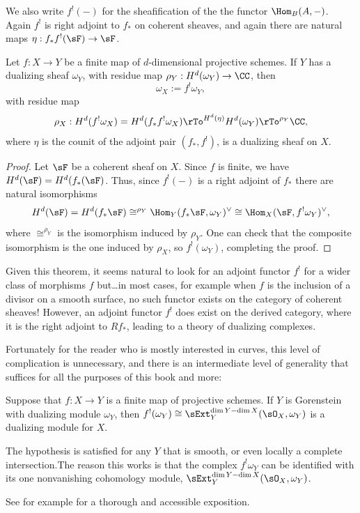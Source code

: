We also write  $f^{!}(-)$ for the sheafification of the the functor 
$\Hom_{B}(A,-)$. Again $f^{!}$ is right adjoint to $f_{*}$ on coherent sheaves,
and again there are natural maps $\eta:f_{*}f^{!}(\sF) \to\sF$. 

\begin{theorem}\label{canonical as Hom}
Let $f: X \to Y$ be a finite map of $d$-dimensional projective schemes. If $Y$ has a dualizing sheaf $\omega_{Y}$,
with residue map $\rho_{Y}: H^{d}(\omega_{Y}) \to \CC$,
then 
 $$
\omega_{X} := f^{!}\omega_{Y},
$$
with residue map 
$$
\rho_{X}: H^{d}(f^{!}\omega_{X}) = H^{d}(f_{*}f^{!}\omega_{X}) \rTo^{H^{d}(\eta)} H^{d}(\omega_{Y}) \rTo^{\rho_{Y}} \CC,
$$ 
where $\eta$ is the counit of the adjoint pair $(f_{*},f^{!})$, is a dualizing sheaf on $X$. 
\end{theorem}

\begin{proof}
Let $\sF$ be a coherent sheaf on $X$. Since $f$ is finite, we have $H^{d}(\sF) = H^{d}(f_{*}(\sF)$. Thus,
since $f^{!}(-)$ is a right adjoint of $f_{*}$ there are natural isomorphisms
$$
H^{d}(\sF) = H^{d}(f_{*}\sF) \cong^{\rho_{Y}} \Hom_{Y}(f_{*}\sF, \omega_{Y})^{\vee} \cong 
\Hom_{X}(\sF, f^{!}\omega_{Y})^{\vee},
$$
where $\cong^{\rho_{Y}}$ is the isomorphism induced by $\rho_{Y}$. One can check that the composite
isomorphism is the one induced by $\rho_{X}$, so $f^{!}(\omega_{Y})$, completing the proof.\end{proof}

\begin{fact}
 Given this theorem, it seems natural to look for an adjoint functor $f^{!}$ for a wider class of morphisms
$f$ but\dots in most cases, for example when $f$ is the inclusion of a divisor on a smooth surface, no such functor exists on the category of coherent sheaves! However, an adjoint functor
$f^{!}$ does exist on the derived category, where it is the right adjoint to $Rf_{*}$, leading to a theory
of dualizing complexes. 

Fortunately for the reader who is mostly interested in curves, this level of 
complication is unnecessary, and there is an intermediate level of generality that suffices
for all the purposes of this book and more: 

\begin{theorem}\label{general adjunction}
Suppose that $f: X\to Y$ is a finite map of projective schemes. If $Y$ is
Gorenstein with dualizing module $\omega_{Y}$, then
$f^{!}(\omega_{Y}) \cong \sExt^{\dim Y-\dim X}_{Y}(\sO_{X}, \omega_{Y})$
is a dualizing module for $X$.
\end{theorem}

The hypothesis is satisfied for any $Y$ that is smooth, or even locally a complete intersection.The
reason this works is that the complex
$f^{!} \omega_{Y}$ 
can be identified with its one nonvanishing cohomology module,
 $\sExt^{\dim Y-\dim X}_{Y}(\sO_{X}, \omega_{Y})$. 

See for example \cite{AltmanKleiman} for a thorough and accessible exposition.
\end{fact}

